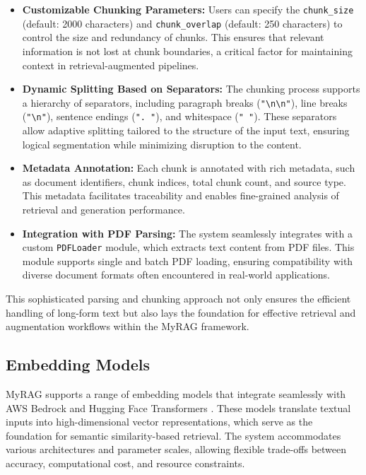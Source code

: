 \documentclass{scrartcl}
\begin{document}
\begin{itemize}
    \item \textbf{Customizable Chunking Parameters:} Users can specify the \texttt{chunk\_size} (default: 2000 characters) and \texttt{chunk\_overlap} (default: 250 characters) to control the size and redundancy of chunks. This ensures that relevant information is not lost at chunk boundaries, a critical factor for maintaining context in retrieval-augmented pipelines.

    \item \textbf{Dynamic Splitting Based on Separators:} The chunking process supports a hierarchy of separators, including paragraph breaks (\texttt{"\textbackslash n\textbackslash n"}), line breaks (\texttt{"\textbackslash n"}), sentence endings (\texttt{". "}), and whitespace (\texttt{" "}). These separators allow adaptive splitting tailored to the structure of the input text, ensuring logical segmentation while minimizing disruption to the content.

    \item \textbf{Metadata Annotation:} Each chunk is annotated with rich metadata, such as document identifiers, chunk indices, total chunk count, and source type. This metadata facilitates traceability and enables fine-grained analysis of retrieval and generation performance.


    \item \textbf{Integration with PDF Parsing:} The system seamlessly integrates with a custom \texttt{PDFLoader} module, which extracts text content from PDF files. This module supports single and batch PDF loading, ensuring compatibility with diverse document formats often encountered in real-world applications.

\end{itemize}

This sophisticated parsing and chunking approach not only ensures the efficient handling of long-form text but also lays the foundation for effective retrieval and augmentation workflows within the MyRAG framework.
\subsection{Embedding Models}
MyRAG supports a range of embedding models that integrate seamlessly with AWS Bedrock and Hugging Face Transformers \cite{huggingfacedocs, AmazonBedrockAPI2024}. These models translate textual inputs into high-dimensional vector representations, which serve as the foundation for semantic similarity-based retrieval. The system accommodates various architectures and parameter scales, allowing flexible trade-offs between accuracy, computational cost, and resource constraints.
\end{document}
